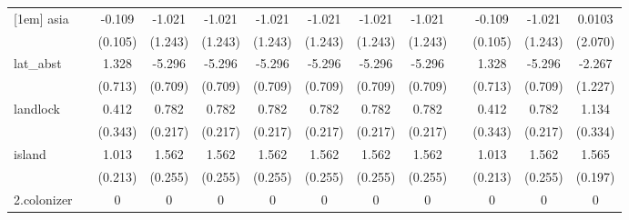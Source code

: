 {\begin{tabular}{l*{12}{c}}
[1em]
asia        &                     &      -0.109         &      -1.021         &      -1.021         &      -1.021         &      -1.021         &      -1.021         &      -1.021         &                     &      -0.109         &      -1.021         &      0.0103         \\
            &                     &     (0.105)         &     (1.243)         &     (1.243)         &     (1.243)         &     (1.243)         &     (1.243)         &     (1.243)         &                     &     (0.105)         &     (1.243)         &     (2.070)         \\
[1em]
lat\_abst    &                     &       1.328         &      -5.296\sym{***}&      -5.296\sym{***}&      -5.296\sym{***}&      -5.296\sym{***}&      -5.296\sym{***}&      -5.296\sym{***}&                     &       1.328         &      -5.296\sym{***}&      -2.267         \\
            &                     &     (0.713)         &     (0.709)         &     (0.709)         &     (0.709)         &     (0.709)         &     (0.709)         &     (0.709)         &                     &     (0.713)         &     (0.709)         &     (1.227)         \\
[1em]
landlock    &                     &       0.412         &       0.782\sym{**} &       0.782\sym{**} &       0.782\sym{**} &       0.782\sym{**} &       0.782\sym{**} &       0.782\sym{**} &                     &       0.412         &       0.782\sym{**} &       1.134\sym{**} \\
            &                     &     (0.343)         &     (0.217)         &     (0.217)         &     (0.217)         &     (0.217)         &     (0.217)         &     (0.217)         &                     &     (0.343)         &     (0.217)         &     (0.334)         \\
[1em]
island      &                     &       1.013\sym{***}&       1.562\sym{***}&       1.562\sym{***}&       1.562\sym{***}&       1.562\sym{***}&       1.562\sym{***}&       1.562\sym{***}&                     &       1.013\sym{***}&       1.562\sym{***}&       1.565\sym{***}\\
            &                     &     (0.213)         &     (0.255)         &     (0.255)         &     (0.255)         &     (0.255)         &     (0.255)         &     (0.255)         &                     &     (0.213)         &     (0.255)         &     (0.197)         \\
[1em]
2.colonizer &                     &           0         &           0         &           0         &           0         &           0         &           0         &           0         &                     &           0         &           0         &           0         \\

\end{tabular}}
